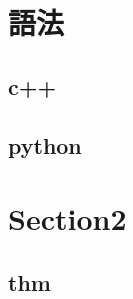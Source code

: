 \section{語法}
    \subsection{c++}
        
    \subsection{python}
        

\section{Section2}
    \subsection{thm}
        